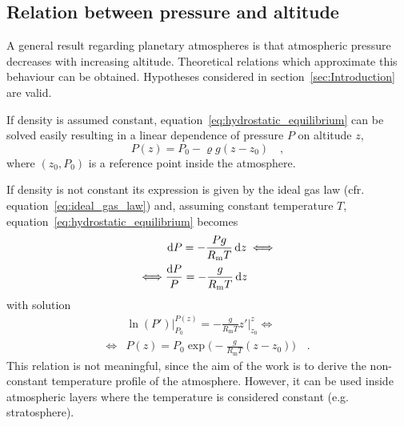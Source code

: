 \documentclass[a4paper,10pt,twocolumn,\classoptions]{article}
\begin{document}
\subsection{Relation between pressure and altitude}
\label{sec:Relation between pressure and altitude}
A general result regarding planetary atmospheres is that atmospheric pressure decreases with increasing altitude. Theoretical relations which approximate this behaviour can be obtained. Hypotheses considered in section~\ref{sec:Introduction} are valid.

If density is assumed constant, equation~\eqref{eq:hydrostatic_equilibrium} can be solved easily resulting in a linear dependence of pressure $P$ on altitude $z$,
\begin{equation}
  \label{eq:pressure_constant_density}
  P(z) = P_0 - \varrho g (z - z_0)
  \quad ,
\end{equation}
where $(z_0, P_0)$ is a reference point inside the atmosphere.

If density is not constant its expression is given by the ideal gas law (cfr. equation~\eqref{eq:ideal_gas_law}) and, assuming constant temperature $T$, equation~\eqref{eq:hydrostatic_equilibrium} becomes
\begin{equation}
  \label{eq:hydrostatic_equilibrium_ideal_gas_law_constant_temperature}
  \begin{split}
    & \odif{P} = - \frac{P g}{R_\text{m} T} \odif{z} \iff \\
    \iff & \frac{\odif{P}}{P} = - \frac{g}{R_\text{m} T} \odif{z}
  \end{split}
\end{equation}
with solution
\begin{equation}
  \label{eq:pressure_constant_temperature}
  \begin{split}
    & \ln(P') \bigg|_{P_0}^{P(z)} = - \frac{g}{R_\text{m} T} z' \bigg|_{z_0}^{z} \iff \\
    \iff & P(z) = P_0 \exp{\bigg( - \frac{g}{R_\text{m} T} (z - z_0) \bigg)}
    \quad .
  \end{split}
\end{equation}
This relation is not meaningful, since the aim of the work is to derive the non-constant temperature profile of the atmosphere. However, it can be used inside atmospheric layers where the temperature is considered constant (e.g. stratosphere).
\end{document}

